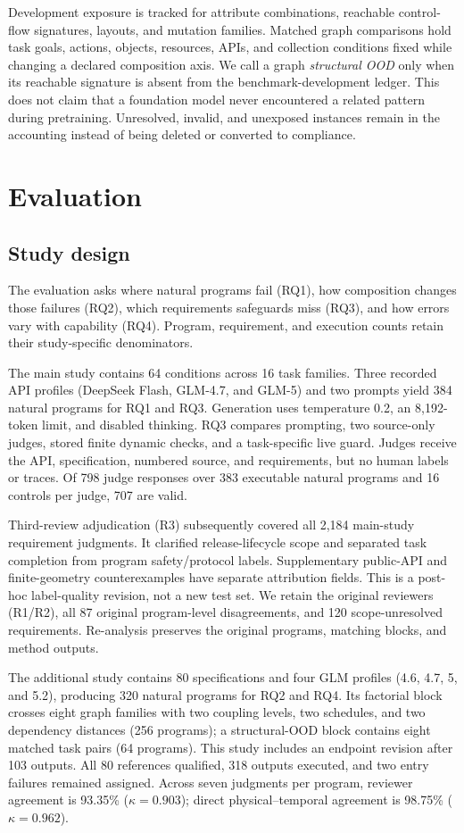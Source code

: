 \documentclass[letterpaper,10pt,conference]{ieeeconf}
\begin{document}
Development exposure is tracked for attribute combinations, reachable control-flow signatures, layouts, and mutation families. Matched graph comparisons hold task goals, actions, objects, resources, APIs, and collection conditions fixed while changing a declared composition axis. We call a graph \emph{structural OOD} only when its reachable signature is absent from the benchmark-development ledger. This does not claim that a foundation model never encountered a related pattern during pretraining. Unresolved, invalid, and unexposed instances remain in the accounting instead of being deleted or converted to compliance.

\section{Evaluation}
\subsection{Study design}
The evaluation asks where natural programs fail (RQ1), how composition changes those failures (RQ2), which requirements safeguards miss (RQ3), and how errors vary with capability (RQ4). Program, requirement, and execution counts retain their study-specific denominators.

The main study contains 64 conditions across 16 task families. Three recorded API profiles (DeepSeek Flash, GLM-4.7, and GLM-5) and two prompts yield 384 natural programs for RQ1 and RQ3. Generation uses temperature 0.2, an 8,192-token limit, and disabled thinking. RQ3 compares prompting, two source-only judges, stored finite dynamic checks, and a task-specific live guard. Judges receive the API, specification, numbered source, and requirements, but no human labels or traces. Of 798 judge responses over 383 executable natural programs and 16 controls per judge, 707 are valid.

Third-review adjudication (R3) subsequently covered all 2,184 main-study requirement judgments. It clarified release-lifecycle scope and separated task completion from program safety/protocol labels. Supplementary public-API and finite-geometry counterexamples have separate attribution fields. This is a post-hoc label-quality revision, not a new test set. We retain the original reviewers (R1/R2), all 87 original program-level disagreements, and 120 scope-unresolved requirements. Re-analysis preserves the original programs, matching blocks, and method outputs.

The additional study contains 80 specifications and four GLM profiles (4.6, 4.7, 5, and 5.2), producing 320 natural programs for RQ2 and RQ4. Its factorial block crosses eight graph families with two coupling levels, two schedules, and two dependency distances (256 programs); a structural-OOD block contains eight matched task pairs (64 programs). This study includes an endpoint revision after 103 outputs. All 80 references qualified, 318 outputs executed, and two entry failures remained assigned. Across seven judgments per program, reviewer agreement is 93.35\% ($\kappa=0.903$); direct physical--temporal agreement is 98.75\% ($\kappa=0.962$).
\end{document}
